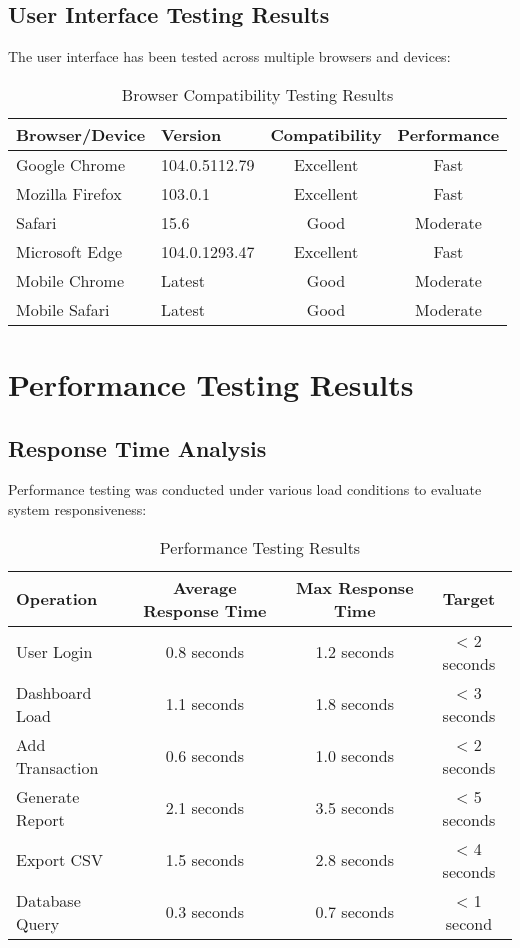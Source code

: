 \subsection{User Interface Testing Results}

The user interface has been tested across multiple browsers and devices:

\begin{table}[h]
\centering
\begin{tabular}{|l|l|c|c|}
\hline
\textbf{Browser/Device} & \textbf{Version} & \textbf{Compatibility} & \textbf{Performance} \\
\hline
Google Chrome & 104.0.5112.79 & Excellent & Fast \\
\hline
Mozilla Firefox & 103.0.1 & Excellent & Fast \\
\hline
Safari & 15.6 & Good & Moderate \\
\hline
Microsoft Edge & 104.0.1293.47 & Excellent & Fast \\
\hline
Mobile Chrome & Latest & Good & Moderate \\
\hline
Mobile Safari & Latest & Good & Moderate \\
\hline
\end{tabular}
\caption{Browser Compatibility Testing Results}
\end{table}

\section{Performance Testing Results}

\subsection{Response Time Analysis}

Performance testing was conducted under various load conditions to evaluate system responsiveness:

\begin{table}[h]
\centering
\begin{tabular}{|l|c|c|c|}
\hline
\textbf{Operation} & \textbf{Average Response Time} & \textbf{Max Response Time} & \textbf{Target} \\
\hline
User Login & 0.8 seconds & 1.2 seconds & < 2 seconds \\
\hline
Dashboard Load & 1.1 seconds & 1.8 seconds & < 3 seconds \\
\hline
Add Transaction & 0.6 seconds & 1.0 seconds & < 2 seconds \\
\hline
Generate Report & 2.1 seconds & 3.5 seconds & < 5 seconds \\
\hline
Export CSV & 1.5 seconds & 2.8 seconds & < 4 seconds \\
\hline
Database Query & 0.3 seconds & 0.7 seconds & < 1 second \\
\hline
\end{tabular}
\caption{Performance Testing Results}
\end{table}

